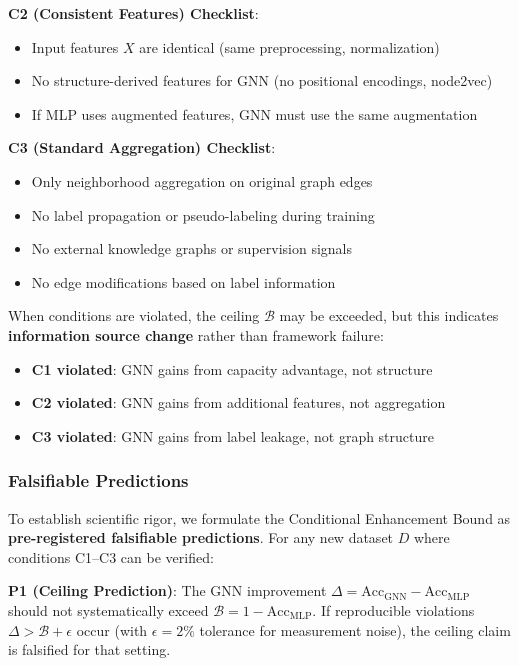 \textbf{C2 (Consistent Features) Checklist}:
\begin{itemize}
    \item[$\square$] Input features $X$ are identical (same preprocessing, normalization)
    \item[$\square$] No structure-derived features for GNN (no positional encodings, node2vec)
    \item[$\square$] If MLP uses augmented features, GNN must use the same augmentation
\end{itemize}

\textbf{C3 (Standard Aggregation) Checklist}:
\begin{itemize}
    \item[$\square$] Only neighborhood aggregation on original graph edges
    \item[$\square$] No label propagation or pseudo-labeling during training
    \item[$\square$] No external knowledge graphs or supervision signals
    \item[$\square$] No edge modifications based on label information
\end{itemize}

\begin{remark}
When conditions are violated, the ceiling $\mathcal{B}$ may be exceeded, but this indicates \textbf{information source change} rather than framework failure:
\begin{itemize}
    \item \textbf{C1 violated}: GNN gains from capacity advantage, not structure
    \item \textbf{C2 violated}: GNN gains from additional features, not aggregation
    \item \textbf{C3 violated}: GNN gains from label leakage, not graph structure
\end{itemize}
\end{remark}

\subsubsection{Falsifiable Predictions}
\label{sec:falsifiable}

To establish scientific rigor, we formulate the Conditional Enhancement Bound as \textbf{pre-registered falsifiable predictions}. For any new dataset $D$ where conditions C1--C3 can be verified:

\textbf{P1 (Ceiling Prediction)}: The GNN improvement $\Delta = \text{Acc}_{\text{GNN}} - \text{Acc}_{\text{MLP}}$ should not systematically exceed $\mathcal{B} = 1 - \text{Acc}_{\text{MLP}}$. If reproducible violations $\Delta > \mathcal{B} + \epsilon$ occur (with $\epsilon = 2\%$ tolerance for measurement noise), the ceiling claim is falsified for that setting.

